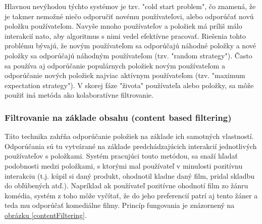 Hlavnou nevýhodou týchto systémov je tzv. "cold start problem", čo znamená, že je takmer nemožné niečo odporučiť novému používateľovi, alebo odporúčať novú položku používateľom. Navyše mnoho používateľov a položiek má príliš málo interakcií nato, aby algoritmus s nimi vedel efektívne pracovať. Riešenia tohto problému bývajú, že novým používateľom sa odporúčajú náhodné položky a nové položky sa odporúčajú náhodným používateľom (tzv. "random strategy"). Často sa používa aj odporúčanie populárnych položiek novým používateľom a odporúčanie nových položiek najviac aktívnym používateľom (tzv. "maximum expectation strategy"). V skorej fáze "života" používateľa alebo položky, sa môže použiť iná metóda ako kolaboratívne filtrovanie. \cite{rs2} \\
	
 
\subsubsection{Filtrovanie na základe obsahu (content based filtering)}
\label{sec:contentbased}
Táto technika zahŕňa odporúčanie položiek na základe ich samotných vlastností. \cite{rs3} Odporúčania sú tu vytvárané na základe predchádzajúcich interakcií jednotlivých používateľov s položkami. Systém pracujúci touto metódou, sa snaží hľadať podobnosti medzi položkami, s ktorými mal používateľ v minulosti pozitívnu interakciu (t.j. kúpil si daný produkt, ohodnotil kladne daný film, pridal skladbu do obľúbených atď.). Napríklad ak používateľ pozitívne ohodnotí film zo žánru komédia, systém z toho môže vyčítať, že do jeho preferencií patrí aj tento žáner a teda mu odporúčať komediálne filmy. \cite{rs1} Princíp fungovania je znázornený na \hyperref[contentFiltering]{obrázku \ref{contentFiltering}}.

